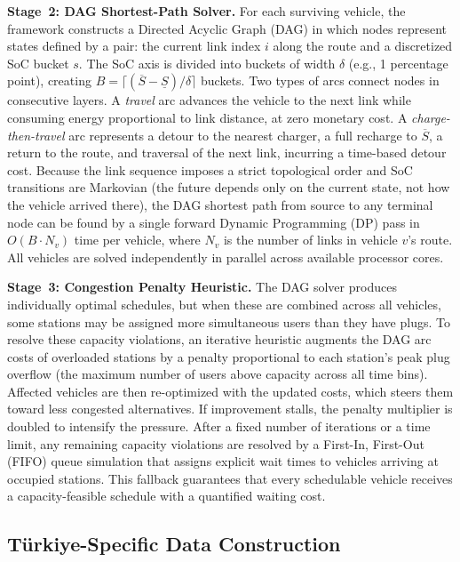 \textbf{Stage~2: DAG Shortest-Path Solver.} For each surviving vehicle, the framework constructs a Directed Acyclic Graph (DAG) in which nodes represent states defined by a pair: the current link index $i$ along the route and a discretized SoC bucket $s$. The SoC axis is divided into buckets of width $\delta$ (e.g., 1 percentage point), creating $B = \lceil(\overline{S} - \underline{S})/\delta\rceil$ buckets. Two types of arcs connect nodes in consecutive layers. A \textit{travel} arc advances the vehicle to the next link while consuming energy proportional to link distance, at zero monetary cost. A \textit{charge-then-travel} arc represents a detour to the nearest charger, a full recharge to $\overline{S}$, a return to the route, and traversal of the next link, incurring a time-based detour cost. Because the link sequence imposes a strict topological order and SoC transitions are Markovian (the future depends only on the current state, not how the vehicle arrived there), the DAG shortest path from source to any terminal node can be found by a single forward Dynamic Programming (DP) pass in $O(B \cdot N_v)$ time per vehicle, where $N_v$ is the number of links in vehicle $v$'s route. All vehicles are solved independently in parallel across available processor cores.

\textbf{Stage~3: Congestion Penalty Heuristic.} The DAG solver produces individually optimal schedules, but when these are combined across all vehicles, some stations may be assigned more simultaneous users than they have plugs. To resolve these capacity violations, an iterative heuristic augments the DAG arc costs of overloaded stations by a penalty proportional to each station's peak plug overflow (the maximum number of users above capacity across all time bins). Affected vehicles are then re-optimized with the updated costs, which steers them toward less congested alternatives. If improvement stalls, the penalty multiplier is doubled to intensify the pressure. After a fixed number of iterations or a time limit, any remaining capacity violations are resolved by a First-In, First-Out (FIFO) queue simulation that assigns explicit wait times to vehicles arriving at occupied stations. This fallback guarantees that every schedulable vehicle receives a capacity-feasible schedule with a quantified waiting cost.

\subsection{T\"{u}rkiye-Specific Data Construction}\label{sec:data_construction}

